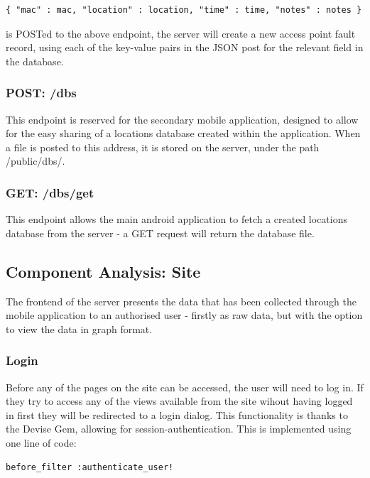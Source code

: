 \documentclass[11pt]{informatics-report}
\begin{document}
\begin{verbatim}
{ "mac" : mac, "location" : location, "time" : time, "notes" : notes }
\end{verbatim}
is POSTed to the above endpoint, the server will create a new access point fault record, using each of the key-value pairs in the JSON post for the relevant field in the database.

\subsubsection{POST: /dbs}

This endpoint is reserved for the secondary mobile application, designed to allow for the easy sharing of a locations database created within the application. When a file is posted to this address, it is stored on the server, under the path /public/dbs/.

\subsubsection{GET: /dbs/get}

This endpoint allows the main android application to fetch a created locations database from the server - a GET request will return the database file.

\subsection{Component Analysis: Site}

The frontend of the server presents the data that has been collected through the mobile application to an authorised user - firstly as raw data, but with the option to view the data in graph format. 

\subsubsection{Login}

Before any of the pages on the site can be accessed, the user will need to log in. If they try to access any of the views available from the site wihout having logged in first they will be redirected to a login dialog. This functionality is thanks to the Devise Gem, allowing for session-authentication. This is implemented using one line of code:

\begin{verbatim}
before_filter :authenticate_user!
\end{verbatim}
\end{document}
